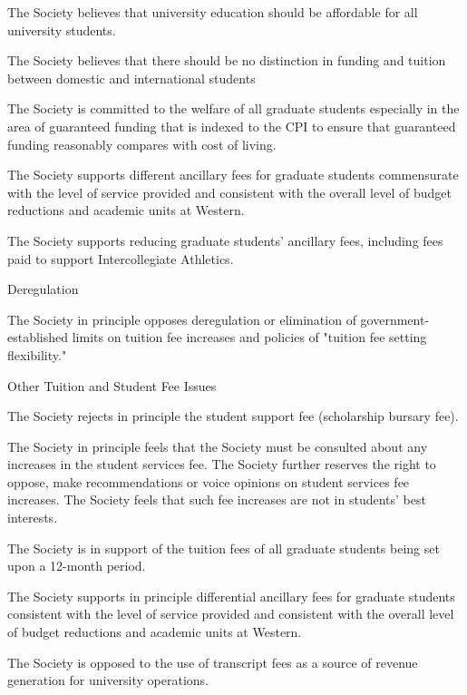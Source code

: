 \begin{longenum}[label*=\thesection.\arabic*., align=left]
\begin{longenum}[label*=\arabic*., align=left]
\begin{longenum}[label*=\arabic*., align=left]
\item The Society believes that university education should be affordable for all university students.
\item The Society believes that there should be no distinction in funding and tuition between domestic and international students
\item The Society is committed to the welfare of all graduate students especially in the area of guaranteed funding that is indexed to the CPI to ensure that guaranteed funding reasonably compares with cost of living.
\item The Society supports different ancillary fees for graduate students commensurate with the level of service provided and consistent with the overall level of budget reductions and academic units at Western.
\item The Society supports reducing graduate students' ancillary fees, including fees paid to support Intercollegiate Athletics.
\end{longenum}
\item Deregulation
\begin{longenum}[label*=\arabic*., align=left]
\item The Society in principle opposes deregulation or elimination of government-established limits on tuition fee increases and policies of "tuition fee setting flexibility."
\end{longenum}
\item Other Tuition and Student Fee Issues
\begin{longenum}[label*=\arabic*., align=left]
\item The Society rejects in principle the student support fee (scholarship bursary fee).
\item The Society in principle feels that the Society must be consulted about any increases in the student services fee. The Society further reserves the right to oppose, make recommendations or voice opinions on student services fee increases. The Society feels that such fee increases are not in students' best interests. 
\item The Society is in support of the tuition fees of all graduate students being set upon a 12-month period.
\item The Society supports in principle differential ancillary fees for graduate students consistent with the level of service provided and consistent with the overall level of budget reductions and academic units at Western.
\item The Society is opposed to the use of transcript fees as a source of revenue generation for university operations. 

\end{longenum}
\end{longenum}
\end{longenum}

